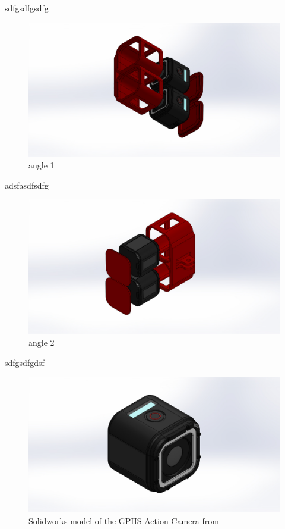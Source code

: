 sdfgsdfgsdfg

\begin{figure}[!ht]
  \includegraphics[width=\linewidth]{figures/stereoHolder1.JPG}
  \caption{angle 1}
  \label{fig:finalcase1}
\end{figure}

adsfasdfsdfg


\begin{figure}[!ht]
  \includegraphics[width=\linewidth]{figures/stereoHolder2.JPG}
  \caption{angle 2}
  \label{fig:finalcase2}
\end{figure}

sdfgsdfgdsf

\begin{figure}[!ht]
  \includegraphics[width=\linewidth]{figures/GoProHero4Session.JPG}
  \caption{Solidworks model of the GPHS Action Camera from \cite{gph4smodelgrabcad}}
  \label{fig:goproherosession4}
\end{figure}

